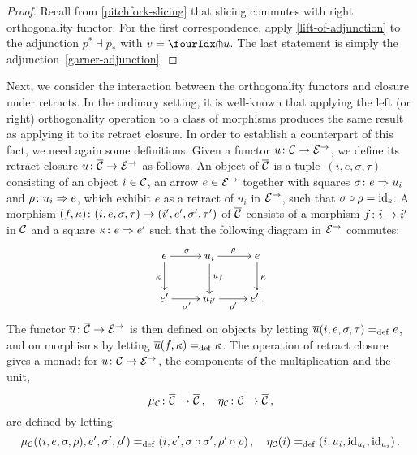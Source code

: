 \documentclass[reqno,10pt,a4paper,oneside]{amsart}
\begin{document}
\begin{proof}
Recall from \cref{pitchfork-slicing} that slicing commutes with right orthogonality functor.
For the first correspondence, apply \cref{lift-of-adjunction} to the adjunction $p^* \dashv p_*$ with  $v = \liftr{u}$.
The last statement is simply the adjunction~\eqref{garner-adjunction}.
\end{proof}

\medskip

Next, we consider the interaction between the orthogonality functors and closure under retracts. In the ordinary setting, it is well-known that
applying the left (or right) orthogonality operation to a class of morphisms produces the same result as applying it to its retract closure. 
In order to establish a counterpart of this fact, we need again some definitions. 
Given a  functor $u \co \cal{C} \to \catE^{\to}$, we define its retract closure $\overline{u} \co \overline{\cal{C}} \to \catE^{\to}$ as follows. 
An object of $\overline{\cal{C}}$ is a tuple~$(i, e, \sigma, \tau)$ consisting of an object $i \in \cal{C}$, an arrow $e \in \cal{E}^\to$ together with squares $\sigma \co e \Rightarrow u_i$ and $\rho \co u_i \Rightarrow e$,
which exhibit $e$ as a retract of $u_i$ in  $\catE^{\to}$,  \ie such that $\sigma \cc \rho = \id_e$. 
A morphism $(f, \kappa) \co (i, e, \sigma, \tau) \to (i', e', \sigma', \tau')$ of $\overline{\cal{C}}$  consists of a morphism $f \co i \to i'$ in $\cal{C}$ and a square $\kappa \co e \Rightarrow e'$  such that the following diagram in $\cal{E}^\to$ commutes:
\[
\xymatrix{
  e
  \ar[r]^{\sigma}
    \ar[d]_{\kappa}
&
  u_i
  \ar[r]^{\rho}
  \ar[d]^{u_f}
&
  e
  \ar[d]^{\kappa}
\\
  e'
  \ar[r]_{\sigma'}
&
  u_{i'}
  \ar[r]_{\rho'}
&
  e' \, .
}
\]
The functor $\overline{u} \co \overline{\cal{C}} \to \catE^\to$ is then defined  on objects  by letting 
$\overline{u}(i, e, \sigma, \tau) \defeq e$,
and on morphisms by letting $\overline{u}(f, \kappa) \defeq \kappa$. The operation of retract closure gives a monad: for $u \co \cal{C} \to \catE^{\to}$,
the components of the multiplication and the unit, 
\[
\mu_\cal{C} \co \overline{\overline{\cal{C}}} \to \overline{\cal{C}} \, , \quad
\eta_\cal{C} \co \cal{C} \to \overline{\cal{C}} \, ,
\]
are defined by letting
\[
\mu_\cal{C}((i, e, \sigma,  \rho), e', \sigma', \rho') \defeq (i, e', \sigma \cc \sigma', \rho' \cc \rho) \, , \quad
\eta_\cal{C}(i) \defeq (i, u_i, \id_{u_i}, \id_{u_i}) \, .
\]
\end{document}
